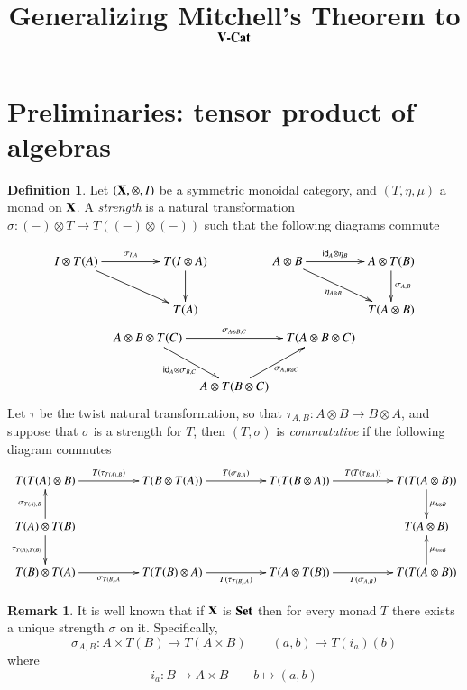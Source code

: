 \documentclass[12pt]{article}
\title{Generalizing Mitchell's Theorem to $\textbf {\textup{V}}\textbf{\textup{-Cat}}$}
\author{}
\theoremstyle{definition}
\newtheorem{definition}[lemma]{Definition}
\newtheorem{remark}[lemma]{Remark}
\newcommand{\Set}{\textbf{\textup{Set}}}
\numberwithin{equation}{section}
\newcommand{\id}[1]{\mathsf{id}_{#1}}
\def\X{\textbf {\textup{X}}}
\begin{document}
	
	\maketitle

	\section{Preliminaries: tensor product of algebras}	
	\begin{definition}
Let $(\X, \otimes, I)$ be a symmetric monoidal category, and $(T, \eta, \mu)$ a monad on $\X$. A \emph{strength} is a natural transformation $\sigma:(-)\otimes T \to T((-) \otimes (-))$  such that the following diagrams commute

\begin{gather*}
\xymatrix@C=20pt{ I \otimes T(A) \ar[rr]^{\sigma_{I,A}} \ar[drr]&&T(I\otimes A) \ar[d]& &A\otimes B \ar[drr]_{\eta_{A\otimes B}} \ar[rr]^-{\id{A}\otimes \eta_B}& &A\otimes T(B)\ar[d]^{\sigma_{A,B}}\\
	&& T(A) && & &T(A\otimes B)}\\
\xymatrix@C=8pt{A\otimes B \otimes T(C)\ar[rr]^{\sigma_{A\otimes B, C} }\ar[dr]_{\id{A}\otimes\sigma_{B,C}} &&  T(A\otimes B \otimes C)\\
& A \otimes T(B\otimes C)\ar[ur]_{\sigma_{A,B\otimes C}}}
\end{gather*}
Let $\tau$ be the twist natural transformation, so that $\tau_{A,B}:A\otimes B\to B\otimes A$, and suppose that $\sigma$ is a strength for $T$, then $(T,\sigma)$ is \emph{commutative} if the following diagram commutes
\[\xymatrix@C=50pt{ T(T(A)\otimes B)\ar[r]^{T(\tau_{T(A),B})}& T(B\otimes T(A)) \ar[r]^{T(\sigma_{B,A})} & T(T(B\otimes A)) \ar[r]^{T(T(\tau_{B,A}))} & T(T(A\otimes B)) \ar[d]^{\mu_{A\otimes B}}\\
	T(A) \otimes T(B) \ar[u]^{\sigma_{T(A),B}}  \ar[d]_{\tau_{T(A),T(B)}}& & &T(A\otimes B)\\
	T(B)\otimes T(A) \ar[r]_{\sigma_{T(B), A}} &T(T(B)\otimes A) \ar[r]_{T(\tau_{T(B),A})}&T(A\otimes T(B)) \ar[r]_{T(\sigma_{A,B})} & T(T(A\otimes B)) \ar[u]_{\mu_{A\otimes B}}}\]	\end{definition}
	
	
	\begin{remark}
	It is well known that if $\X$ is $\Set$ then for every monad $T$ there exists a unique strength $\sigma$ on it. Specifically,
	\[\sigma_{A,B}: A\times T(B) \to T(A\times B) \qquad (a,b)\mapsto T(i_a)(b)\]
	 where 
	 \[i_a: B\to  A\times B \qquad b\mapsto (a, b)\]
	\end{remark}
\end{document}
